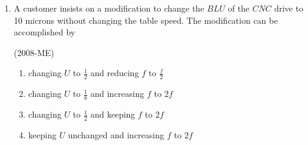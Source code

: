 \documentclass[journal]{IEEEtran}
\begin{document}
\begin{enumerate}
 \begin{enumerate}
 \end{enumerate}
 \item A customer insists on a modification to change the $BLU$
 of the $CNC$
 drive to 10 microns without changing the table speed. The modification can be accomplished by 

 \hfill (2008-ME)
 \begin{enumerate}
     \item changing $U$ to $\frac{1}{2}$ and reducing $f$ to $\frac{f}{2}$
     \item changing $U$ to $\frac{1}{8}$ and increasing $f$ to $2f$
     \item changing $U$ to $\frac{1}{2}$ and keeping $f$ to $2f$
     \item keeping  $U$ unchanged and increasing $f$ to $2f$
 \end{enumerate}
\end{enumerate}
\end{document}
